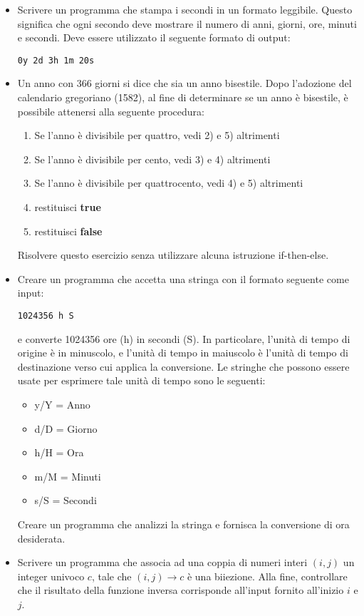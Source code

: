 \documentclass[]{scrartcl}
\begin{document}
\begin{itemize}
\item Scrivere un programma che stampa i secondi in un formato leggibile. Questo significa che ogni secondo deve mostrare il numero di anni, giorni, ore, minuti e secondi. Deve essere utilizzato il seguente formato di output:
\begin{center}
\texttt{0y 2d 3h 1m 20s}
\end{center}
\item Un anno con 366 giorni si dice che sia un anno bisestile. Dopo l'adozione del calendario gregoriano (1582), al fine di determinare se un anno è bisestile, è possibile attenersi alla seguente procedura:
\begin{enumerate}
\item Se l'anno è divisibile per quattro, vedi 2) e 5) altrimenti
\item Se l'anno è divisibile per cento, vedi 3) e 4) altrimenti
\item Se l'anno è divisibile per quattrocento, vedi 4) e 5) altrimenti
\item restituisci \textbf{true}
\item restituisci \textbf{false}
\end{enumerate}
Risolvere questo esercizio senza utilizzare alcuna istruzione if-then-else.

\item Creare un programma che accetta una stringa con il formato seguente come input:
\begin{center}
	\texttt{1024356 h S}
\end{center}
e converte 1024356 ore (h) in secondi (S). In particolare, l'unità di tempo di origine è in minuscolo, e l'unità di tempo in maiuscolo è l'unità di tempo di destinazione verso cui applica la conversione. Le stringhe che possono essere usate per esprimere tale unità di tempo sono le seguenti:
\begin{itemize}
\item y/Y = Anno
\item d/D = Giorno
\item  h/H = Ora
\item  m/M = Minuti
\item  s/S = Secondi
\end{itemize}
Creare un programma che analizzi la stringa e fornisca la conversione di ora desiderata.

\item  Scrivere un programma che associa ad una coppia di numeri interi $(i, j)$ un integer univoco 
$c$, tale che $(i,j)\to c$ è una biiezione. Alla fine, controllare che il risultato della funzione inversa corrisponde all'input fornito all'inizio $i$ e $j$.


\end{itemize}
\end{document}
